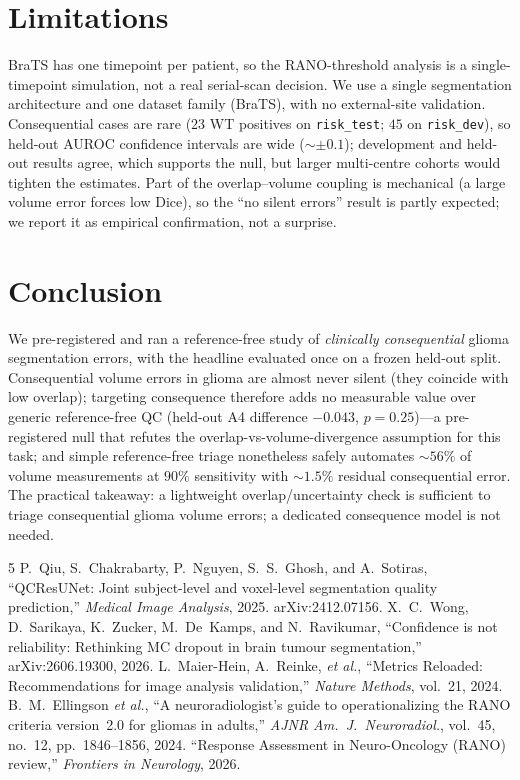 \documentclass[conference]{IEEEtran}
\begin{document}
\section{Limitations}
BraTS has one timepoint per patient, so the RANO-threshold analysis is a
single-timepoint simulation, not a real serial-scan decision. We use a single
segmentation architecture and one dataset family (BraTS), with no external-site
validation. Consequential cases are rare ($23$ WT positives on
\texttt{risk\_test}; $45$ on \texttt{risk\_dev}), so held-out AUROC confidence
intervals are wide (${\sim}\pm0.1$); development and held-out results agree,
which supports the null, but larger multi-centre cohorts would tighten the
estimates. Part of the overlap--volume coupling is mechanical (a large volume
error forces low Dice), so the ``no silent errors'' result is partly expected;
we report it as empirical confirmation, not a surprise.

\section{Conclusion}
We pre-registered and ran a reference-free study of \emph{clinically
consequential} glioma segmentation errors, with the headline evaluated once on a
frozen held-out split. Consequential volume errors in glioma are almost never
silent (they coincide with low overlap); targeting consequence therefore adds no
measurable value over generic reference-free QC (held-out A4 difference
$-0.043$, $p{=}0.25$)---a pre-registered null that refutes the
overlap-vs-volume-divergence assumption for this task; and simple reference-free
triage nonetheless safely automates ${\sim}56\%$ of volume measurements at $90\%$
sensitivity with ${\sim}1.5\%$ residual consequential error. The practical
takeaway: a lightweight overlap/uncertainty check is sufficient to triage
consequential glioma volume errors; a dedicated consequence model is not needed.

\begin{thebibliography}{5}
P.~Qiu, S.~Chakrabarty, P.~Nguyen, S.~S.~Ghosh, and A.~Sotiras,
``QCResUNet: Joint subject-level and voxel-level segmentation quality
prediction,'' \emph{Medical Image Analysis}, 2025. arXiv:2412.07156.
X.~C.~Wong, D.~Sarikaya, K.~Zucker, M.~De~Kamps, and N.~Ravikumar,
``Confidence is not reliability: Rethinking MC dropout in brain tumour
segmentation,'' arXiv:2606.19300, 2026.
L.~Maier-Hein, A.~Reinke, \emph{et al.},
``Metrics Reloaded: Recommendations for image analysis validation,''
\emph{Nature Methods}, vol.~21, 2024.
B.~M.~Ellingson \emph{et al.},
``A neuroradiologist's guide to operationalizing the RANO criteria version~2.0
for gliomas in adults,'' \emph{AJNR Am.\ J.\ Neuroradiol.}, vol.~45, no.~12,
pp.~1846--1856, 2024.
``Response Assessment in Neuro-Oncology (RANO) review,''
\emph{Frontiers in Neurology}, 2026.
\end{thebibliography}
\end{document}
